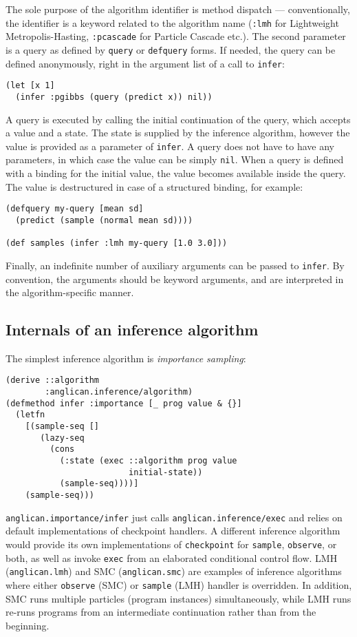 \documentclass[preprint]{sigplanconf}
\begin{document}
The sole purpose of the algorithm identifier is method dispatch
--- conventionally, the identifier is a keyword related to the
algorithm name (\texttt{:lmh} for Lightweight
Metropolis-Hasting, \texttt{:pcascade} for Particle Cascade
etc.). The second parameter is a query as defined by
\texttt{query} or \texttt{defquery} forms. If needed, the query
can be defined anonymously, right in the argument list of a call
to \texttt{infer}:
\begin{lstlisting}[style=default]
(let [x 1]
  (infer :pgibbs (query (predict x)) nil))
\end{lstlisting}
A query is executed by calling the initial continuation of the
query, which accepts a value and a state. The state is supplied
by the inference algorithm, however the value is provided as a
parameter of \texttt{infer}. A query does not have to have any
parameters, in which case the value can be simply \texttt{nil}.
When a query is defined with a binding for the initial value,
the value becomes available inside the query. The value is
destructured in case of a structured binding, for example:
\begin{lstlisting}[style=default]
(defquery my-query [mean sd]
  (predict (sample (normal mean sd))))

(def samples (infer :lmh my-query [1.0 3.0]))
\end{lstlisting}
Finally, an indefinite number of auxiliary arguments can be
passed to \texttt{infer}. By convention, the arguments should be
keyword arguments, and are interpreted in the algorithm-specific
manner.

\subsection{Internals of an inference algorithm}

The simplest inference algorithm is \textit{importance
sampling}:
\begin{lstlisting}[style=default]
(derive ::algorithm
        :anglican.inference/algorithm)
(defmethod infer :importance [_ prog value & {}]
  (letfn
    [(sample-seq []
       (lazy-seq
         (cons
           (:state (exec ::algorithm prog value
                         initial-state))
           (sample-seq))))]
    (sample-seq)))
\end{lstlisting}
\texttt{anglican.importance/{\linebreak[0]}infer} just calls
\texttt{anglican.inference/{\linebreak[0]}exec} and relies on default
implementations of checkpoint handlers. A different inference
algorithm would provide its own implementations of
\texttt{checkpoint} for \texttt{sample}, \texttt{observe}, or
both, as well as invoke \texttt{exec} from an elaborated
conditional control flow. LMH (\texttt{anglican.lmh}) and SMC
(\texttt{anglican.smc}) are examples of inference algorithms
where either \texttt{observe} (SMC) or \texttt{sample} (LMH)
handler is overridden. In addition, SMC runs multiple particles
(program instances) simultaneously, while LMH runs re-runs
programs from an intermediate continuation rather than from the
beginning.
\end{document}
